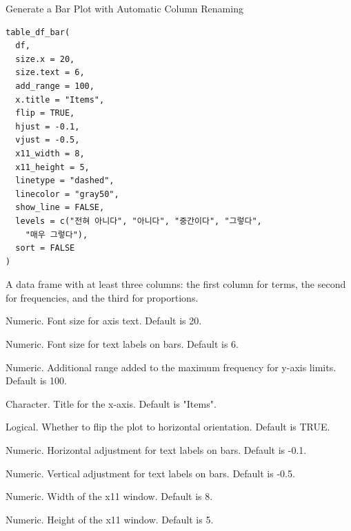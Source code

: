 \documentclass[a4paper]{book}
\begin{document}
%
\begin{Description}
Generate a Bar Plot with Automatic Column Renaming
\end{Description}
%
\begin{Usage}
\begin{verbatim}
table_df_bar(
  df,
  size.x = 20,
  size.text = 6,
  add_range = 100,
  x.title = "Items",
  flip = TRUE,
  hjust = -0.1,
  vjust = -0.5,
  x11_width = 8,
  x11_height = 5,
  linetype = "dashed",
  linecolor = "gray50",
  show_line = FALSE,
  levels = c("전혀 아니다", "아니다", "중간이다", "그렇다",
    "매우 그렇다"),
  sort = FALSE
)
\end{verbatim}
\end{Usage}
%
\begin{Arguments}
\begin{ldescription}
\item[\code{df}] A data frame with at least three columns: the first column for terms, the second for frequencies, and the third for proportions.

\item[\code{size.x}] Numeric. Font size for axis text. Default is 20.

\item[\code{size.text}] Numeric. Font size for text labels on bars. Default is 6.

\item[\code{add\_range}] Numeric. Additional range added to the maximum frequency for y-axis limits. Default is 100.

\item[\code{x.title}] Character. Title for the x-axis. Default is "Items".

\item[\code{flip}] Logical. Whether to flip the plot to horizontal orientation. Default is TRUE.

\item[\code{hjust}] Numeric. Horizontal adjustment for text labels on bars. Default is -0.1.

\item[\code{vjust}] Numeric. Vertical adjustment for text labels on bars. Default is -0.5.

\item[\code{x11\_width}] Numeric. Width of the x11 window. Default is 8.

\item[\code{x11\_height}] Numeric. Height of the x11 window. Default is 5.


\end{ldescription}
\end{Arguments}
\end{document}
